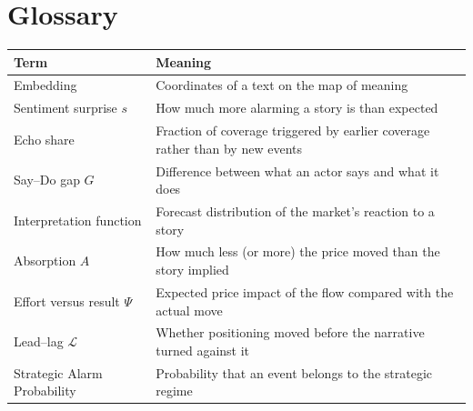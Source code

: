 \documentclass[11pt,a4paper]{article}
\theoremstyle{plain}
\theoremstyle{definition}
\begin{document}
\section{Glossary}\label{app:glossary}
\begin{center}
\small
\begin{tabularx}{\textwidth}{@{}lX@{}}
\toprule
Term & Meaning \\
\midrule
Embedding & Coordinates of a text on the map of meaning \\
Sentiment surprise $s$ & How much more alarming a story is than expected \\
Echo share & Fraction of coverage triggered by earlier coverage rather than by new events \\
Say--Do gap $G$ & Difference between what an actor says and what it does \\
Interpretation function & Forecast distribution of the market's reaction to a story \\
Absorption $A$ & How much less (or more) the price moved than the story implied \\
Effort versus result $\Psi$ & Expected price impact of the flow compared with the actual move \\
Lead--lag $\mathcal{L}$ & Whether positioning moved before the narrative turned against it \\
Strategic Alarm Probability & Probability that an event belongs to the strategic regime \\
\bottomrule
\end{tabularx}
\end{center}
\end{document}
